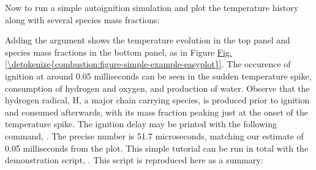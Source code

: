 \documentclass[letterpaper,10pt,english]{sphinxmanual}
\begin{document}
\begin{sphinxVerbatim}[commandchars=\\\{\}]
   
   
\end{sphinxVerbatim}

Now to run a simple autoignition simulation and plot the temperature history along with several species mass fractions:

\begin{sphinxVerbatim}[commandchars=\\\{\}]
\PYG{p}{[}    \PYG{p}{]}
\end{sphinxVerbatim}

Adding the  argument shows the temperature evolution in the top panel and species mass fractions in the bottom panel, as in Figure \hyperref[\detokenize{combustion:figure-simple-example-easyplot}]{Fig.\@ \ref{\detokenize{combustion:figure-simple-example-easyplot}}}.
The occurence of ignition at around 0.05 milliseconds can be seen in the sudden temperature spike, consumption of hydrogen and oxygen, and production of water.
Observe that the hydrogen radical, H, a major chain carrying species, is produced prior to ignition and consumed afterwards, with its mass fraction peaking just at the onset of the temperature spike.
The ignition delay may be printed with the following command, .
The precise number is 51.7 microseconds, matching our estimate of 0.05 milliseconds from the plot.
This simple tutorial can be run in total with the demonstration script, .
This script is reproduced here as a summary:
\end{document}
